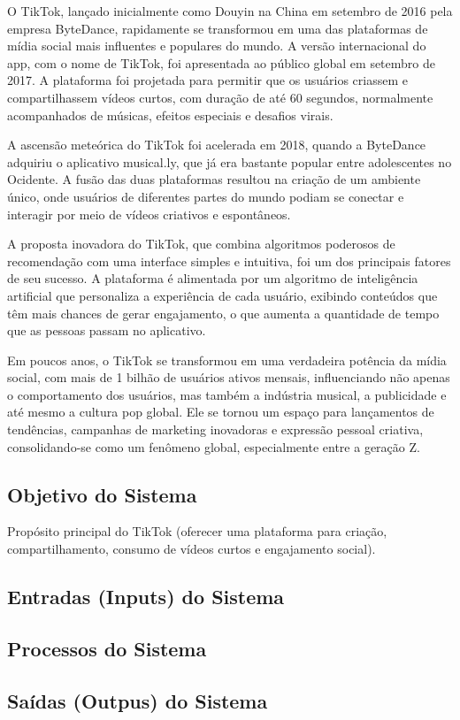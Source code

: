 O TikTok, lançado inicialmente como Douyin na China em setembro de 2016 pela empresa ByteDance, rapidamente se transformou em uma das plataformas de mídia social mais influentes e populares do mundo. A versão internacional do app, com o nome de TikTok, foi apresentada ao público global em setembro de 2017. A plataforma foi projetada para permitir que os usuários criassem e compartilhassem vídeos curtos, com duração de até 60 segundos, normalmente acompanhados de músicas, efeitos especiais e desafios virais.\vskip0.3cm

A ascensão meteórica do TikTok foi acelerada em 2018, quando a ByteDance adquiriu o aplicativo musical.ly, que já era bastante popular entre adolescentes no Ocidente. A fusão das duas plataformas resultou na criação de um ambiente único, onde usuários de diferentes partes do mundo podiam se conectar e interagir por meio de vídeos criativos e espontâneos.\vskip0.3cm

A proposta inovadora do TikTok, que combina algoritmos poderosos de recomendação com uma interface simples e intuitiva, foi um dos principais fatores de seu sucesso. A plataforma é alimentada por um algoritmo de inteligência artificial que personaliza a experiência de cada usuário, exibindo conteúdos que têm mais chances de gerar engajamento, o que aumenta a quantidade de tempo que as pessoas passam no aplicativo.\vskip0.3cm

Em poucos anos, o TikTok se transformou em uma verdadeira potência da mídia social, com mais de 1 bilhão de usuários ativos mensais, influenciando não apenas o comportamento dos usuários, mas também a indústria musical, a publicidade e até mesmo a cultura pop global. Ele se tornou um espaço para lançamentos de tendências, campanhas de marketing inovadoras e expressão pessoal criativa, consolidando-se como um fenômeno global, especialmente entre a geração Z.




\newpage
\subsection{Objetivo do Sistema}


Propósito principal do TikTok (oferecer uma plataforma para criação, compartilhamento, consumo de vídeos curtos e engajamento social).

\subsection{Entradas (Inputs) do Sistema}


\subsection{Processos do Sistema}

\subsection{Saídas (Outpus) do Sistema}
